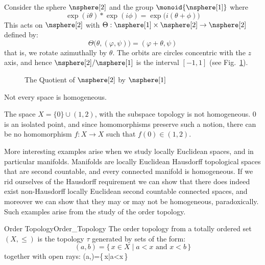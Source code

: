 \documentclass{article}                                                        %
\begin{document}
        \begin{example}
            Consider the sphere $\nsphere[2]$ and the group
            $\monoid{\nsphere[1]}$ where
            \begin{equation}
                \exp(i\theta)*\exp(i\phi)=\exp\big(i(\theta+\phi)\big)
            \end{equation}
            This acts on $\nsphere[2]$ with
            $\Theta:\nsphere[1]\times\nsphere[2]\rightarrow\nsphere[2]$ defined
            by:
            \begin{equation}
                \Theta\big(\theta,(\varphi,\psi)\big)=(\varphi+\theta,\psi)
            \end{equation}
            that is, we rotate azimuthally by $\theta$. The orbits are circles
            concentric with the $z$ axis, and hence $\nsphere[2]/\nsphere[1]$ is
            the interval $[\minus{1},1]$ (see Fig.~\ref{fig:Quotient_S2_by_S1}).
        \end{example}
        \begin{figure}[H]
            \centering
            \captionsetup{type=figure}
            
            \caption{The Quotient of $\nsphere[2]$ by $\nsphere[1]$}
            \label{fig:Quotient_S2_by_S1}
        \end{figure}
        Not every space is homogeneous.
        \begin{example}
            The space $X=\{0\}\cup(1,2)$, with the subspace topology is not
            homogeneous. $0$ is an isolated point, and since homomorphisms
            preserve such a notion, there can be no homomorphism
            $f:X\rightarrow{X}$ such that $f(0)\in(1,2)$.
        \end{example}
        More interesting examples arise when we study locally Euclidean spaces,
        and in particular manifolds. Manifolds are locally Euclidean Hausdorff
        topological spaces that are second countable, and every connected
        manifold is homogeneous. If we rid ourselves of the Hausdorff
        requirement we can show that there does indeed exist non-Hausdorff
        locally Euclidean second countable connected spaces, and moreover we
        can show that they may or may not be homogeneous, paradoxically. Such
        examples arise from the study of the order topology.
        \begin{fdefinition}{Order Topology}{Order_Topology}
            The order topology from a totally ordered set $(X,\leq)$ is
            the topology $\tau$ generated by sets of the form:
            \begin{equation}
                (a,b)=\{\,x\in{X}\;|\;a<x\textrm{ and }x<b\,\}
            \end{equation}
            together with open rays:
                        {(a,\infty)=\{\,x\;|\;a<x\,\}}
        \end{fdefinition}
\end{document}
